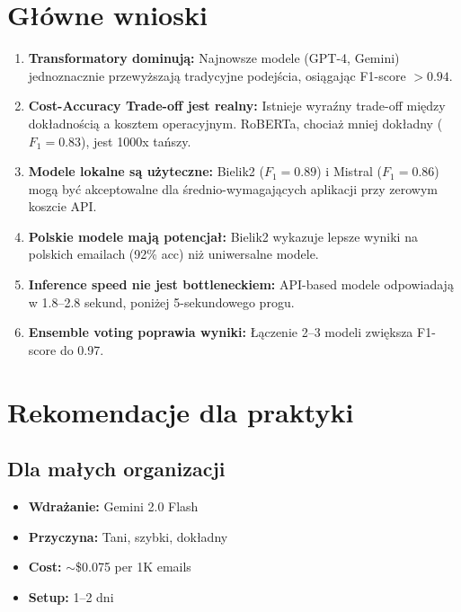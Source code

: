 \documentclass[11pt]{extreport}
\begin{document}
\section{Główne wnioski}
\label{sec:wnioski-glowne}

\begin{enumerate}
    \item \textbf{Transformatory dominują:} Najnowsze modele (GPT-4, Gemini) jednoznacznie przewyższają tradycyjne podejścia, osiągając F1-score $> 0.94$.
    
    \item \textbf{Cost-Accuracy Trade-off jest realny:} Istnieje wyraźny trade-off między dokładnością a kosztem operacyjnym. RoBERTa, chociaż mniej dokładny ($F_1=0.83$), jest 1000x tańszy.
    
    \item \textbf{Modele lokalne są użyteczne:} Bielik2 ($F_1=0.89$) i Mistral ($F_1=0.86$) mogą być akceptowalne dla średnio-wymagających aplikacji przy zerowym koszcie API.
    
    \item \textbf{Polskie modele mają potencjał:} Bielik2 wykazuje lepsze wyniki na polskich emailach (92\% acc) niż uniwersalne modele.
    
    \item \textbf{Inference speed nie jest bottleneckiem:} API-based modele odpowiadają w 1.8--2.8 sekund, poniżej 5-sekundowego progu.
    
    \item \textbf{Ensemble voting poprawia wyniki:} Łączenie 2--3 modeli zwiększa F1-score do 0.97.
\end{enumerate}

\section{Rekomendacje dla praktyki}
\label{sec:rekomendacje-praktyka}

\subsection{Dla małych organizacji}
\begin{itemize}
    \item \textbf{Wdrażanie:} Gemini 2.0 Flash
    \item \textbf{Przyczyna:} Tani, szybki, dokładny
    \item \textbf{Cost:} $\sim$\$0.075 per 1K emails
    \item \textbf{Setup:} 1--2 dni
\end{itemize}
\end{document}
